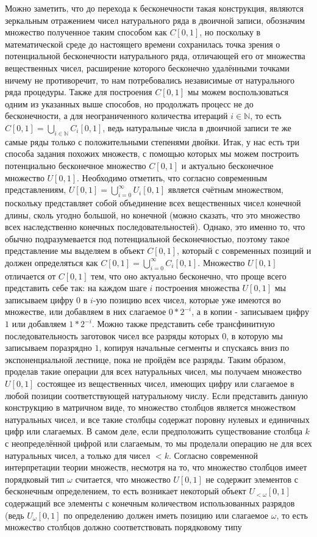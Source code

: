 \documentclass[12pt]{article}
\begin{document}
Можно заметить, что до перехода к бесконечности такая конструкция, являются зеркальным отражением чисел натурального ряда в двоичной записи, обозначим множество полученное таким способом как $C[0, 1]$, но поскольку в математической среде до настоящего времени сохранилась точка зрения о потенциальной бесконечности натурального ряда, отличающей его от множества вещественных чисел, расширение которого бесконечно удалёнными точками ничему не противоречит, то нам потребовались независимые от натурального ряда процедуры. Также для построения $C[0, 1]$ мы можем воспользоваться одним из указанных выше способов, но продолжать процесс не до бесконечности, а для неограниченного количества итераций $i \in \mathbb{N}$, то есть $C[0, 1] = \bigcup\limits_{i \in \mathbb{N}} C_i[0, 1]$, ведь натуральные числа в двоичной записи те же самые ряды только с положительными степенями двойки. Итак, у нас есть три способа задания похожих множеств, с помощью которых мы можем построить потенциально бесконечное множество $C[0, 1]$ и актуально бесконечное множество $U[0, 1]$. Необходимо отметить, что согласно современным представлениям, $U[0, 1] = \bigcup\limits^{\infty}_{i = 0} U_i[0, 1]$ является счётным множеством, поскольку представляет собой объединение всех вещественных чисел конечной длины, сколь угодно большой, но конечной (можно сказать, что это множество всех наследственно конечных последовательностей). Однако, это именно то, что обычно подразумевается под потенциальной бесконечностью, поэтому такое представление мы выделяем в объект $C[0, 1]$, который с современных позиций и должен определяться как $C[0, 1] = \bigcup\limits^{\infty}_{i = 0} C_i[0, 1]$. Множество $U[0, 1]$ отличается от $C[0, 1]$ тем, что оно актуально бесконечно, что проще всего представить себе так: на каждом шаге $i$ построения множества $U[0, 1]$ мы записываем цифру $0$ в $i$-ую позицию всех чисел, которые уже имеются во множестве, или добавляем в них слагаемое $0*2^{-i}$, а в копии - записываем цифру $1$ или добавляем $1*2^{-i}$. Можно также представить себе трансфинитную последовательность заготовок чисел все разряды которых $0$, в которую мы записываем поразрядно $1$, копируя начальные сегменты и спускаясь вниз по экспоненциальной лестнице, пока не пройдём все разряды. Таким образом, проделав такие операции для всех натуральных чисел, мы получаем множество $U[0, 1]$ состоящее из вещественных чисел, имеющих цифру или слагаемое в любой позиции соответствующей натуральному числу. Если представить данную конструкцию в матричном виде, то множество столбцов является множеством натуральных чисел, и все такие столбцы содержат поровну нулевых и единичных цифр или слагаемых. В самом деле, если предположить существование столбца $k$ с неопределённой цифрой или слагаемым, то мы проделали операцию не для всех натуральных чисел, а только для чисел $< k$. Согласно современной интерпретации теории множеств, несмотря на то, что множество столбцов имеет порядковый тип $\omega$ считается, что множество $U[0, 1]$ не содержит элементов с бесконечным определением, то есть возникает некоторый объект $U_{<\omega}[0, 1]$ содержащий все элементы с конечным количеством использованных разрядов (ведь $U_{\omega}[0, 1]$ по определению должен иметь позицию или слагаемое $\omega$, то есть множество столбцов должно соответствовать порядковому типу 
\end{document}

